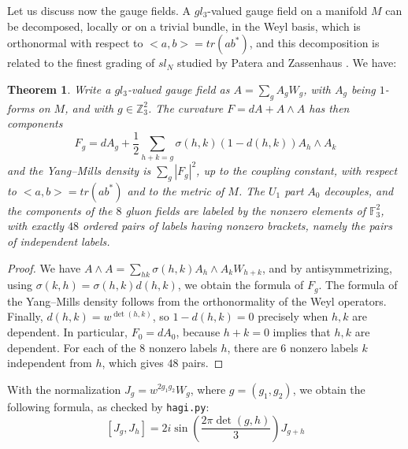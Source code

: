 \documentclass[11pt]{amsart}
\newtheorem{theorem}{Theorem}[section]
\theoremstyle{definition}
\begin{document}
Let us discuss now the gauge fields. A $gl_3$-valued gauge field on a manifold $M$ can be decomposed, locally or on a trivial bundle, in the Weyl basis, which is orthonormal with respect to $<a,b>=tr(ab^*)$, and this decomposition is related to the finest grading of $sl_N$ studied by Patera and Zassenhaus \cite{pz}. We have:

\begin{theorem}
Write a $gl_3$-valued gauge field as $A=\sum_gA_gW_g$, with $A_g$ being $1$-forms on $M$, and with $g\in\mathbb Z_3^2$. The curvature $F=dA+A\wedge A$ has then components
$$F_g=dA_g+\frac{1}{2}\sum_{h+k=g}\sigma(h,k)(1-d(h,k))A_h\wedge A_k$$
and the Yang--Mills density is $\sum_g|F_g|^2$, up to the coupling constant, with respect to $<a,b>=tr(ab^*)$ and to the metric of $M$. The $U_1$ part $A_0$ decouples, and the components of the $8$ gluon fields are labeled by the nonzero elements of $\mathbb F_3^2$, with exactly $48$ ordered pairs of labels having nonzero brackets, namely the pairs of independent labels.
\end{theorem}

\begin{proof}
We have $A\wedge A=\sum_{hk}\sigma(h,k)A_h\wedge A_kW_{h+k}$, and by antisymmetrizing, using $\sigma(k,h)=\sigma(h,k)d(h,k)$, we obtain the formula of $F_g$. The formula of the Yang--Mills density follows from the orthonormality of the Weyl operators. Finally, $d(h,k)=w^{\det(h,k)}$, so $1-d(h,k)=0$ precisely when $h,k$ are dependent. In particular, $F_0=dA_0$, because $h+k=0$ implies that $h,k$ are dependent. For each of the $8$ nonzero labels $h$, there are $6$ nonzero labels $k$ independent from $h$, which gives $48$ pairs.
\end{proof}

With the normalization $J_g=w^{2g_1g_2}W_g$, where $g=(g_1,g_2)$, we obtain the following formula, as checked by {\tt hagi.py}:
$$[J_g,J_h]=2i\sin\left(\frac{2\pi\det(g,h)}{3}\right)J_{g+h}$$
\end{document}
